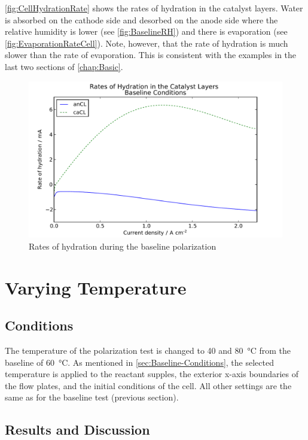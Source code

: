 \autoref{fig:CellHydrationRate} shows the rates of hydration in the catalyst layers.  Water is absorbed on the cathode side and desorbed on the anode side where the relative humidity is lower (see \autoref{fig:BaselineRH}) and there is evaporation (see \autoref{fig:EvaporationRateCell}).  Note, however, that the rate of hydration is much slower than the rate of evaporation.  This is consistent with the examples in the last two sections of \autoref{chap:Basic}.

\begin{figure}[htbp]
  \includegraphics[width=\linewidth]{Results/Cell/Model/1/HydrationRate}%
  \caption{Rates of hydration during the baseline polarization}%
  \label{fig:CellHydrationRate}
\end{figure}


\FloatBarrier %
\section{Varying Temperature}
\label{sec:Temperature}

\subsection{Conditions}

The temperature of the polarization test is changed to 40 and \SI{80}{\celsius} from the 
baseline of \SI{60}{\celsius}.  As mentioned in \autoref{sec:Baseline-Conditions}, the selected temperature is applied to the reactant supples, the exterior x-axis boundaries of the flow plates, and the initial conditions of the cell.  All other settings are the same as for the baseline test (previous section).

\subsection{Results and Discussion}

